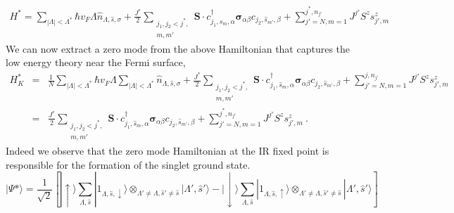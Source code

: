 \documentclass[aps,prx,preprint,groupedaddress]{revtex4-2}
\begin{document}
\begin{eqnarray}
H^{*}=\sum_{|\Lambda|<\Lambda^{*}}\hbar v_{F}\Lambda\hat{n}_{\Lambda,\hat{s},\sigma}+\frac{J^{*}}{2}\sum_{\substack{j_{1},j_{2}<j^{*},\\ m,m'}}\mathbf{S}\cdot c^{\dagger}_{j_{1},\hat{s}_{m},\alpha}\boldsymbol{\sigma}_{\alpha\beta}c_{j_{2},\hat{s}_{m'},\beta}+\sum_{j'=N,m=1}^{j^{*},n_{j'}}J^{j'}S^{z}s^{z}_{j',m}\label{fixedPointHam}
\end{eqnarray} 
We can now extract a zero mode from the above Hamiltonian that captures the low energy theory near the Fermi surface,
\begin{eqnarray}
H^{*}_{K}&=&\frac{1}{N}\sum_{|\Lambda|<\Lambda^{*}}\hbar v_{F}\Lambda\sum_{|\Lambda|<\Lambda^{*}}\hat{n}_{\Lambda,\hat{s},\sigma}+\frac{J^{*}}{2}\sum_{\substack{j_{1},j_{2}<j^{*},\\ m,m'}}\mathbf{S}\cdot c^{\dagger}_{j_{1},\hat{s}_{m},\alpha}\boldsymbol{\sigma}_{\alpha\beta}c_{j_{2},\hat{s}_{m'},\beta}+\sum_{j'=N,m=1}^{j,n_{j'}}J^{j'}S^{z}s^{z}_{j',m}\nonumber\\
		&=&\frac{J^{*}}{2}\sum_{\substack{j_{1},j_{2}<j^{*},\\ m,m'}}\mathbf{S}\cdot c^{\dagger}_{j_{1},\hat{s}_{m},\alpha}\boldsymbol{\sigma}_{\alpha\beta}c_{j_{2},\hat{s}_{m'},\beta}+\sum_{j'=N,m=1}^{j^{*},n_{j'}}J^{j'}S^{z}s^{z}_{j',m}~.
\end{eqnarray}
Indeed we observe that the zero mode Hamiltonian at the IR fixed point is responsible for the formation of the singlet ground state.
\begin{equation}
|\Psi*\rangle=\frac{1}{\sqrt{2}}\left[|\uparrow\rangle\sum_{\Lambda,\hat{s}}|1_{\Lambda,\hat{s},\downarrow}\rangle\otimes_{\Lambda'\neq\Lambda,\hat{s}'\neq \hat{s}}|\Lambda',\hat{s}'\rangle-|\downarrow\rangle\sum_{\Lambda,\hat{s}}|1_{\Lambda,\hat{s},\uparrow}\rangle\otimes_{\Lambda'\neq\Lambda,\hat{s}'\neq \hat{s}}|\Lambda',\hat{s}'\rangle\right]
\end{equation}
\end{document}
